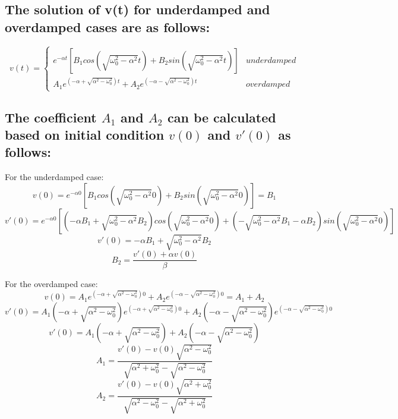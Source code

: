 \documentclass{article}
\begin{document}
\subsection{The solution of v(t) for underdamped and overdamped cases are as follows:}
\[ 
v(t)=
    \begin{cases} 
        e^{-\alpha t}[B_1cos(\sqrt{\omega_0^2-\alpha^2}t)+B_2sin(\sqrt{\omega_0^2-\alpha^2}t)] & underdamped \\
        A_1e^{(-\alpha+\sqrt{\alpha^2-\omega_0^2})t} + A_2e^{(-\alpha-\sqrt{\alpha^2-\omega_0^2})t} & overdamped 
    \end{cases}
\]

\subsection{The coefficient $A_1$ and $A_2$ can be calculated based on initial condition $v(0)$ and $v'(0)$ as follows:}
For the underdamped case:
$$v(0) =e^{-\alpha 0}[B_1cos(\sqrt{\omega_0^2-\alpha^2}0)+B_2sin(\sqrt{\omega_0^2-\alpha^2}0)] = B_1$$
$$v'(0) =e^{-\alpha 0}[(-\alpha B_1 + \sqrt{\omega_0^2-\alpha^2} B_2)cos(\sqrt{\omega_0^2-\alpha^2}0)+(-\sqrt{\omega_0^2-\alpha^2}B_1-\alpha B_2)sin(\sqrt{\omega_0^2-\alpha^2}0)]$$
$$v'(0)=-\alpha B_1 + \sqrt{\omega_0^2-\alpha^2} B_2$$
$$ B_2 = \frac{v'(0) + \alpha v(0)}{\beta} $$

For the overdamped case:
$$v(0) = A_1e^{(-\alpha+\sqrt{\alpha^2-\omega_0^2})0} + A_2e^{(-\alpha-\sqrt{\alpha^2-\omega_0^2})0} = A_1 + A_2$$
$$v'(0) = A_1(-\alpha+\sqrt{\alpha^2-\omega_0^2})e^{(-\alpha+\sqrt{\alpha^2-\omega_0^2})0} + A_2(-\alpha-\sqrt{\alpha^2-\omega_0^2})e^{(-\alpha-\sqrt{\alpha^2-\omega_0^2})0}$$
$$v'(0) = A_1(-\alpha+\sqrt{\alpha^2-\omega_0^2}) + A_2(-\alpha-\sqrt{\alpha^2-\omega_0^2})$$
$$A_1 = \frac{v'(0)-v(0)\sqrt{\alpha^2-\omega_0^2}}{\sqrt{\alpha^2+\omega_0^2}-\sqrt{\alpha^2-\omega_0^2}}$$
$$A_2 = \frac{v'(0)-v(0)\sqrt{\alpha^2+\omega_0^2}}{\sqrt{\alpha^2-\omega_0^2}-\sqrt{\alpha^2+\omega_0^2}}$$
\end{document}
